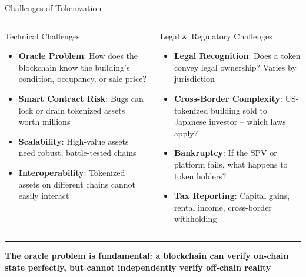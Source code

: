 \documentclass[8pt,aspectratio=169]{beamer}
\newcommand{\bottomnote}[1]{\vfill\vspace{-2mm}\textcolor{mllavender2}{\rule{\textwidth}{0.4pt}}\vspace{1mm}\footnotesize\textbf{#1}}
\begin{document}
\begin{frame}{Challenges of Tokenization}
\begin{columns}[T]
\begin{block}{Technical Challenges}
\footnotesize
\begin{itemize}
  \item \textbf{Oracle Problem}: How does the blockchain know the building's condition, occupancy, or sale price?
  \item \textbf{Smart Contract Risk}: Bugs can lock or drain tokenized assets worth millions
  \item \textbf{Scalability}: High-value assets need robust, battle-tested chains
  \item \textbf{Interoperability}: Tokenized assets on different chains cannot easily interact
\end{itemize}
\end{block}

\begin{block}{Legal \& Regulatory Challenges}
\footnotesize
\begin{itemize}
  \item \textbf{Legal Recognition}: Does a token convey legal ownership? Varies by jurisdiction
  \item \textbf{Cross-Border Complexity}: US-tokenized building sold to Japanese investor -- which laws apply?
  \item \textbf{Bankruptcy}: If the SPV or platform fails, what happens to token holders?
  \item \textbf{Tax Reporting}: Capital gains, rental income, cross-border withholding
\end{itemize}
\end{block}
\end{columns}
\vspace{3mm}
\centering
{}
\bottomnote{The oracle problem is fundamental: a blockchain can verify on-chain state perfectly, but cannot independently verify off-chain reality}
\end{frame}
\end{document}
